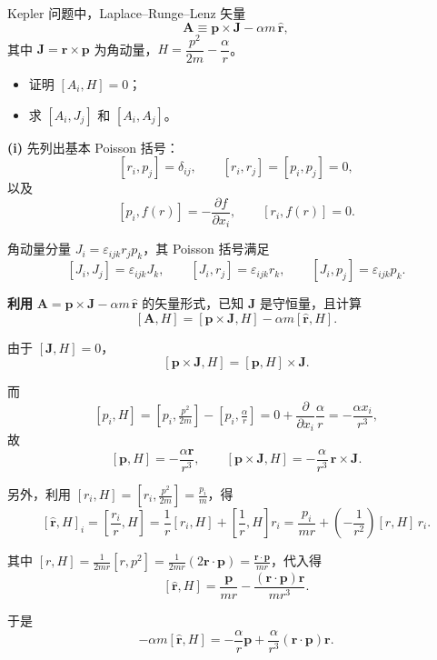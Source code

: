 \begin{question}
Kepler 问题中，Laplace--Runge--Lenz 矢量
\[
\boldsymbol A \equiv \boldsymbol p \times \boldsymbol J - \alpha m\,\hat{\boldsymbol r},
\]
其中 \(\boldsymbol J = \boldsymbol r \times \boldsymbol p\) 为角动量，\(H = \dfrac{p^2}{2m} - \dfrac{\alpha}{r}\)。
\begin{itemize}
  \item[\textup{(i)}] 证明 \([A_i,H]=0\)；
  \item[\textup{(ii)}] 求 \([A_i,J_j]\) 和 \([A_i,A_j]\)。
\end{itemize}
\begin{solution}
\textbf{(i)} 先列出基本 Poisson 括号：
\[
[r_i,p_j] = \delta_{ij},\qquad
[r_i,r_j]=[p_i,p_j]=0,
\]
以及
\[
[p_i,f(r)] = -\frac{\partial f}{\partial x_i},\qquad
[r_i,f(r)] = 0.
\]

角动量分量 \(J_i = \varepsilon_{ijk}r_jp_k\)，其 Poisson 括号满足
\[
[J_i,J_j] = \varepsilon_{ijk}J_k,\qquad
[J_i,r_j] = \varepsilon_{ijk}r_k,\qquad
[J_i,p_j] = \varepsilon_{ijk}p_k.
\]


\textbf{利用} \(\boldsymbol A = \boldsymbol p \times \boldsymbol J - \alpha m\,\hat{\boldsymbol r}\) 的矢量形式，已知 \(\boldsymbol J\) 是守恒量，且计算
\[
[\boldsymbol A, H] = [\boldsymbol p \times \boldsymbol J, H] - \alpha m [\hat{\boldsymbol r}, H].
\]

由于 \([\boldsymbol J, H]=0\)，
\[
[\boldsymbol p \times \boldsymbol J, H] = [\boldsymbol p, H] \times \boldsymbol J.
\]

而
\[
[p_i, H] = [p_i, \tfrac{p^2}{2m}] - [p_i, \tfrac{\alpha}{r}]
= 0 + \frac{\partial}{\partial x_i}\frac{\alpha}{r}
= -\frac{\alpha x_i}{r^3},
\]
故
\[
[\boldsymbol p, H] = -\frac{\alpha\boldsymbol r}{r^3},\qquad
[\boldsymbol p \times \boldsymbol J, H] = -\frac{\alpha}{r^3}\,\boldsymbol r \times \boldsymbol J.
\]

另外，利用 \([r_i, H] = [r_i, \tfrac{p^2}{2m}] = \frac{p_i}{m}\)，得
\[
[\hat{\boldsymbol r}, H]_i = \left[\frac{r_i}{r}, H\right]
= \frac{1}{r}[r_i,H] + \left[\frac{1}{r}, H\right]r_i
= \frac{p_i}{mr} + \left(-\frac{1}{r^2}\right)[r, H]\,r_i.
\]

其中 \([r, H] = \frac{1}{2mr}[r, p^2] = \frac{1}{2mr}(2\boldsymbol r\!\cdot\!\boldsymbol p)
= \frac{\boldsymbol r\!\cdot\!\boldsymbol p}{mr}\)，代入得
\[
[\hat{\boldsymbol r}, H] = \frac{\boldsymbol p}{mr}
- \frac{(\boldsymbol r\!\cdot\!\boldsymbol p)\boldsymbol r}{mr^3}.
\]

于是
\[
-\alpha m[\hat{\boldsymbol r}, H] = -\frac{\alpha}{r}\boldsymbol p
+ \frac{\alpha}{r^3}(\boldsymbol r\!\cdot\!\boldsymbol p)\boldsymbol r.
\]


\end{solution}
\end{question}
